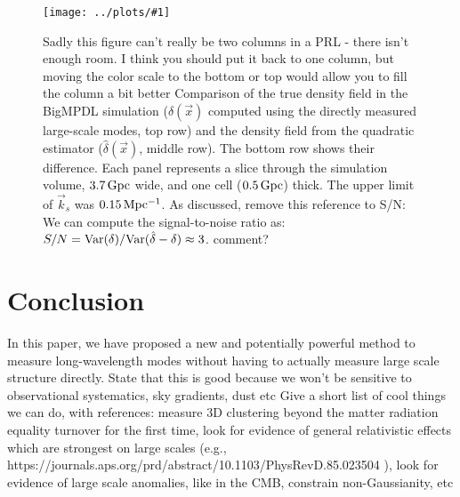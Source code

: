 \documentclass[prd,amsmath,amssymb,floatfix,superscriptaddress,nofootinbib,twocolumn]{revtex4-1}
\newcommand{\Var}{\rm Var}
\newcommand{\vk}{\vec{k}}
\newcommand{\sfig}[2]{
\texttt{[image: ../plots/\#1]}
        }
\newcommand{\Sfig}[2]{
   \begin{figure}[thbp]
   \begin{center}
    \sfig{../plots/#1.pdf}{\columnwidth}
    \caption{{\small #2}}
    \label{fig:#1}
     \end{center}
   \end{figure}
}
\newcommand{\peikai}[1]{{\color{blue} #1}}
\newcommand{\RC}[1]{{\color{darkorange} #1}}
\begin{document}
\Sfig{real}{\RC{Sadly this figure can't really be two columns in a PRL - there isn't enough room. I think you should put it back to one column, but moving the color scale to the bottom or top would allow you to fill the column a bit better} Comparison of the true density field in
  the BigMPDL simulation ($\delta(\vec{x})$ computed using the
  directly measured large-scale modes, top row) and the density
  field from the quadratic estimator ($\hat{\delta}(\vec{x})$, middle row).
  The bottom row shows their difference. Each panel represents a slice through
  the simulation volume,  $3.7\,\rm Gpc$ wide, and
  one cell ($0.5\,\rm Gpc$) thick.  The upper limit of $\vk_s$ was $0.15 \, \rm Mpc^{-1}$. \RC{As discussed, remove this reference to
  S/N: We can compute the signal-to-noise ratio as: $S/N=\Var(\delta)/\Var(\hat{\delta}-\delta)\approx 3$. \peikai{comment?}}}
  
\section{Conclusion}\label{sec4}
In this paper, we have proposed a new and potentially powerful method to measure long-wavelength modes without having to actually measure large scale structure directly.
\RC{ State that this is good because we won't be sensitive to
  observational systematics, sky gradients, dust etc}
\RC{Give a short list of cool things we can do, with references: measure 3D clustering
  beyond the matter radiation equality turnover for the first time,
  look for evidence of general relativistic effects which are strongest
  on large scales (e.g., https://journals.aps.org/prd/abstract/10.1103/PhysRevD.85.023504 ), look for evidence of large scale anomalies, like in the CMB,
  constrain non-Gaussianity, 
  etc }
\end{document}

